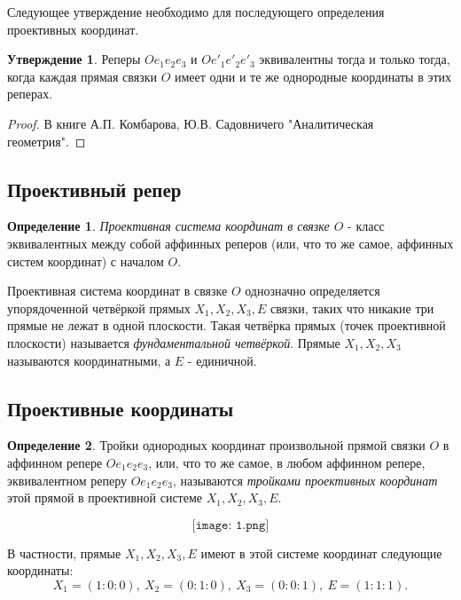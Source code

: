 \documentclass[a4paper, 12pt]{article}
\theoremstyle{definition}
\newtheorem*{definition}{Определение}
\newtheorem*{subtheorem}{Утверждение}
\begin{document}
Следующее утверждение необходимо для последующего определения проективных координат.

\begin{subtheorem}
    Реперы $Oe_1e_2e_3$ и $Oe'_1e'_2e'_3$ эквивалентны тогда и только тогда, когда каждая прямая связки $O$ имеет одни и те же однородные координаты в этих реперах.
\end{subtheorem}
\begin{proof}
    В книге А.П. Комбарова, Ю.В. Садовничего "Аналитическая геометрия".
\end{proof}

\subsection{Проективный репер}
\begin{definition}
    \textit{Проективная система координат в связке $O$} - класс эквивалентных между собой аффинных реперов (или, что то же самое, аффинных систем координат) с началом $O$.
\end{definition}

Проективная система координат в связке $O$ однозначно определяется упорядоченной четвёркой прямых $X_1, X_2, X_3, E$ связки, таких что никакие три прямые не лежат в одной плоскости. Такая четвёрка прямых (точек проективной плоскости) называется \textit{фундаментальной четвёркой}. Прямые $X_1, X_2, X_3$ называются координатными, а $E$ - единичной.

\subsection{Проективные координаты}
\begin{definition}
    Тройки однородных координат произвольной прямой связки $O$ в аффинном репере $Oe_1e_2e_3$, или, что то же самое, в любом аффинном репере, эквивалентном реперу $Oe_1e_2e_3$, называются \textit{тройками проективных координат} этой прямой в проективной системе $X_1, X_2, X_3, E$.
\end{definition}

\[\texttt{[image: 1.png]}\]

В частности, прямые $X_1, X_2, X_3, E$ имеют в этой системе координат следующие координаты:
\[ X_1 = (1:0:0), \ X_2 = (0:1:0), \ X_3 = (0:0:1), \ E = (1:1:1). \]
\end{document}

